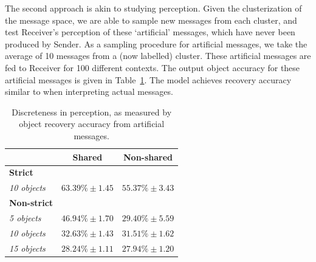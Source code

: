 \documentclass[11pt,a4paper]{article}
\newcommand{\nbEC}[1]{{\leavevmode\color{blue}{\scriptsize#1}}}
\newcommand{\nbSST}[1]{{\leavevmode\color{violet}{\scriptsize#1}}}
\begin{document}
The second approach is akin to studying perception. Given the clusterization of the message space, we are able to sample new messages from each cluster, and test Receiver's perception of these `artificial' messages, which have never been produced by Sender. 
As a sampling procedure for artificial messages, we take the average of 10 messages from a (now labelled) cluster. These artificial messages are fed to Receiver for 100 different contexts. The output object accuracy for these artificial messages is given in Table~\ref{tab:average_message_accuracy}. The model achieves recovery accuracy similar to when interpreting actual messages. %

\begin{table}[]
\begin{tabular}{lcc}
\toprule
                       & \textbf{Shared} & \textbf{Non-shared} \\ \midrule
\textbf{Strict} & \\
\emph{10 objects} & 
	$63.39\%\pm 1.45$  & $55.37\%\pm 3.43$      \\ %
\textbf{Non-strict} & \\
\emph{5 objects} &
	$46.94\%\pm 1.70$  & $29.40\%\pm 5.59$      \\
\emph{10 objects} &
	$32.63\%\pm 1.43$  & $31.51\%\pm 1.62$      \\
\emph{15 objects} &
	$28.24\%\pm 1.11$  & $27.94\%\pm 1.20$      \\ \bottomrule
\end{tabular}
\caption{Discreteness in perception, as measured by object recovery accuracy from artificial messages.}
\label{tab:average_message_accuracy}
\end{table}
\end{document}
